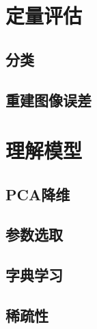     \subsection{}

\section{定量评估}
    \label{sec:analyze}
    \subsection{分类}
    \subsection{重建图像误差}

\section{理解模型}
    \label{sec:lookInto}
    \subsection{PCA降维}
    \subsection{参数选取}
    \subsection{字典学习}
    \subsection{稀疏性}



